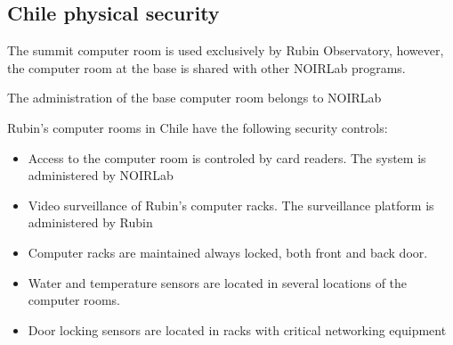 \subsection{Chile physical security} \label{sec:chileps}

The summit computer room is used exclusively by Rubin Observatory, however, 
the computer room at the base is shared with other NOIRLab programs. 

The administration of the base computer room belongs to NOIRLab

Rubin's computer rooms in Chile have the following security controls:
\begin{itemize}
\item Access to the computer room is controled by card readers. The system is administered by NOIRLab
\item Video surveillance of Rubin's computer racks. The surveillance platform is administered by Rubin
\item Computer racks are maintained always locked, both front and back door. 
\item Water and temperature sensors are located in several locations of the computer rooms.
\item Door locking sensors are located in racks with critical networking equipment
\end{itemize}
